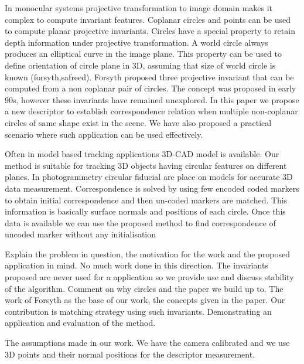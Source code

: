 \documentclass{bmvc2k}
\begin{document}
In monocular systems projective transformation to image domain makes it complex to compute invariant features. Coplanar circles and points can be used to compute planar projective invariants. Circles have a special property to retain depth information under projective transformation. A world circle always produces an elliptical curve in the image plane. This property can be used to define orientation of circle plane in 3D, assuming that size of world circle is known (forsyth,safreed). Forsyth proposed three projective invariant that can be computed from a non coplanar pair of circles. The concept was proposed in early 90s, however these invariants have remained unexplored. In this paper we propose a new descriptor to establish correspondence relation when multiple non-coplanar circles of same shape exist in the scene. We have also proposed a practical scenario where such application can be used effectively.  

Often in model based tracking applications 3D-CAD model is available. Our method is suitable for tracking 3D objects having circular features on different planes. In photogrammetry circular fiducial are place on models for accurate 3D data measurement. Correspondence is solved by using few encoded coded markers to obtain initial correspondence and then un-coded markers are matched. This information is basically surface normals and positions of each circle. Once this data is available we can use the proposed method to find correspondence of uncoded marker without any initialisation

Explain the problem in question, the motivation for the work and the proposed application in mind.
No much work done in this direction. The invariants proposed are never used for a application so we provide use and discuss stability of the algorithm. Comment on why circles and the paper we build up to. 
The work of Forsyth as the base of our work, the concepts given in the paper. Our contribution is matching strategy using such invariants. Demonstrating an application and evaluation of the method. 

The assumptions made in our work. We have the camera calibrated and we use 3D points and their normal positions for the descriptor measurement. 
\end{document}
